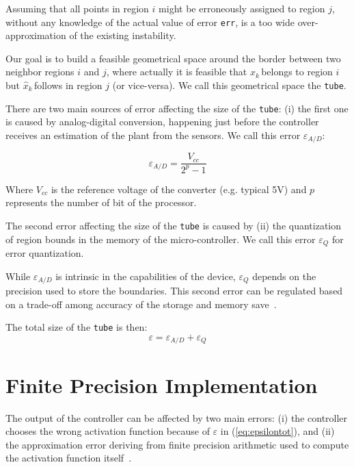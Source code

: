 \documentclass[sigconf]{acmart}
\newcommand{\statevarmath}{$x_{k}\,$}
\newcommand{\qstatevarmath}{$\hat{x}_{k}\,$}
\begin{document}
Assuming that all points in region $i$ might be erroneously assigned to region $j$, without any  knowledge of the actual value of error \texttt{err}, is a too wide over-approximation of the existing instability. 

Our goal is to build a feasible geometrical space around the border between two neighbor regions $i$ and $j$, where actually it is feasible that \statevarmath belongs to region $i$ but \qstatevarmath follows in region $j$ (or vice-versa).
We call this geometrical space the \texttt{tube}.

There are two main sources of error affecting the size of the \texttt{tube}: (i) the first one is caused by analog-digital conversion, happening just before the controller receives an estimation of the plant from the sensors. We call this error $\varepsilon_{A/D}$: 

\begin{equation}\nonumber
\varepsilon_{A/D}=\frac{V_{cc}}{2^{p}-1}
\end{equation}

Where $V_{cc}$ is the reference voltage of the converter (e.g. typical 5V) and $p$ represents the number of bit of the processor.

The second error affecting the size of the \texttt{tube} is caused by (ii) the quantization of region bounds in the memory of the micro-controller. We call this error $\varepsilon_{Q}$ for error quantization.

While $\varepsilon_{A/D}$ is intrinsic in the capabilities of the device, $\varepsilon_{Q}$ depends on the precision used to store the boundaries. This second error can be regulated based on a trade-off among accuracy of the storage and memory save~\cite{memoryMPC}.

The total size of the \texttt{tube} is then:
\begin{equation}\label{eq:epsilontot}
\varepsilon=\varepsilon_{A/D}+\varepsilon_{Q}
\end{equation}
\section{Finite Precision Implementation}
The output of the controller can be affected by two main errors: (i) the controller chooses the wrong activation function because of $\varepsilon$ in (\ref{eq:epsilontot}), and (ii) the approximation error deriving from finite precision arithmetic used to compute the activation function itself~\cite{imperialrmpc}.
 
\end{document}
